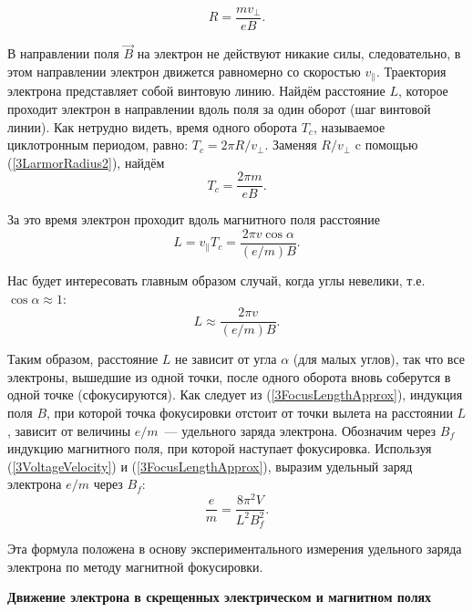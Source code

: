 \begin{equation}
R =\frac{mv_{\bot}}{eB}.
\label{3LarmorRadius2}
\end{equation}

В направлении поля $\vec{B}$ на электрон не действуют никакие силы, следовательно, в этом направлении электрон движется равномерно со скоростью $v_{\parallel}$. Траектория электрона представляет собой винтовую линию. Найдём расстояние $L$, которое проходит электрон в направлении вдоль поля за один оборот (шаг винтовой линии). Как нетрудно видеть, время одного оборота $T_c$, называемое циклотронным периодом, равно: $T_c=2\pi R/v_{\bot}$. Заменяя $R/v_{\bot}$ c помощью (\ref{3LarmorRadius2}), найдём
\begin{equation}
T_c =\frac{2\pi m}{eB}.
\label{3CyclotronPeriod}
\end{equation}

За это время электрон проходит вдоль магнитного поля расстояние
\begin{equation}
L = v_{\parallel}T_c =\frac{2\pi v\cos\alpha}{(e/m)B}.
\label{3FocusLength}
\end{equation}

Нас будет интересовать главным образом случай, когда углы невелики, т.е. $\cos\alpha \approx 1$:
\begin{equation}
L \approx \frac{2\pi v}{(e/m)B}.
\label{3FocusLengthApprox}
\end{equation}

Таким образом, расстояние $L$ не зависит от угла $\alpha$ (для малых углов), так что все электроны, вышедшие из одной точки, после одного оборота вновь соберутся в одной точке (сфокусируются). Как следует из (\ref{3FocusLengthApprox}), индукция поля $B$, при которой точка фокусировки отстоит от точки вылета на расстоянии $L$, зависит от величины $e/m$~--- удельного заряда электрона. Обозначим через $B_f$ индукцию магнитного поля, при которой наступает фокусировка. Используя (\ref{3VoltageVelocity}) и (\ref{3FocusLengthApprox}), выразим удельный заряд электрона $e/m$ через $B_f$:
\begin{equation}
\frac{e}{m}=\frac{8\pi^2 V}{L^2B_f^2}.
\label{3FocusResult}
\end{equation}

Эта формула положена в основу экспериментального измерения удельного заряда электрона по \textsf{методу магнитной
фокусировки}.

{\bf \Large Движение электрона в скрещенных электрическом и магнитном полях}

